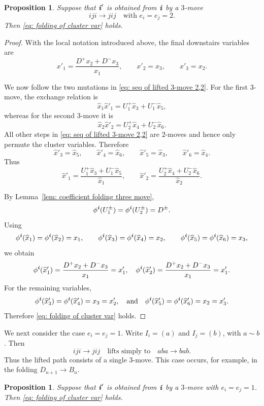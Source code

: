 \documentclass[12pt, leqno]{amsart}
\numberwithin{equation}{section}
\theoremstyle{plain}
\newtheorem{proposition}[lemma]{Proposition}
\theoremstyle{definition}
\newcommand{\ii}{ \textbf{\textit{i}}}
\newcommand{\hx}{\widehat{x}}
\newcommand{\qtq}[1][{and}]{\quad\text{{#1}}\quad}
\begin{document}
\begin{proposition}\label{prop: cluster variable folding three move 22}
Suppose that $\ii'$ is obtained from $\ii$ by a $3$-move
\[
iji\longrightarrow jij \quad \text{with $e_i=e_j=2$.}
\]
Then \eqref{eq: folding of cluster var} holds.
\end{proposition}

\begin{proof}
 With the local notation introduced above, the final downstairs variables are
\[
x'_1=\frac{D^+x_2+D^-x_3}{x_1}, \qquad x'_2=x_3, \qquad x'_3=x_2.
\]

We now follow the two mutations in
\eqref{eq: seq of lifted 3-move 2,2}.
For the first $3$-move, the exchange relation is
\[
\hx_1\hx'_1=U_1^+\hx_3+U_1^-\hx_5,
\]
whereas for the second $3$-move it is
\[
\hx_2\hx'_2=U_2^+\hx_4+U_2^-\hx_6.
\]
All other steps in
\eqref{eq: seq of lifted 3-move 2,2}
are $2$-moves and hence only permute the cluster variables. Therefore
\[
\hx'_3=\hx_5,\qquad   \hx'_4=\hx_6,\qquad   \hx'_5=\hx_3,\qquad   \hx'_6=\hx_4.
\]
Thus
\[
\hx'_1= \frac{U_1^+\hx_3+U_1^-\hx_5}{\hx_1},
\qquad
\hx'_2= \frac{U_2^+\hx_4+U_2^-\hx_6}{\hx_2}.
\]

By Lemma~\ref{lem: coefficient folding three move},
\[
\phi^\ii(U_1^\pm) =\phi^\ii(U_2^\pm) = D^\pm.
\]
Using
\[
\phi^\ii(\hx_1)=\phi^\ii(\hx_2)=x_1,\qquad
\phi^\ii(\hx_3)=\phi^\ii(\hx_4)=x_2,\qquad
\phi^\ii(\hx_5)=\phi^\ii(\hx_6)=x_3,
\]
we obtain
\[
\begin{aligned}
\phi^\ii(\hx'_1) =   \frac{D^+x_2+D^-x_3}{x_1} =x'_1,\quad \phi^\ii(\hx'_2) =  \frac{D^+x_2+D^-x_3}{x_1} =x'_1.
\end{aligned}
\]
For the remaining variables,
\[
\phi^\ii(\hx'_3)=\phi^\ii(\hx'_4)=x_3=x'_2,
\qtq
\phi^\ii(\hx'_5)=\phi^\ii(\hx'_6)=x_2=x'_3.
\]
 Therefore
\eqref{eq: folding of cluster var} holds.
\end{proof}

We next consider the case $e_i=e_j=1$.
Write $I_i=(a)$ and $I_j=(b)$, with $a\sim b$.  Then
\[
  iji\longrightarrow jij \quad\text{lifts simply to}\quad  aba\longrightarrow bab.
\]
Thus the lifted path consists of a single $3$-move.
 This case occurs, for example, in the
folding $D_{n+1}\to B_n$.

\begin{proposition}\label{prop: cluster variable folding three move 11}
Suppose that $\ii'$ is obtained from $\ii$ by a $3$-move with
$e_i=e_j=1$. Then \eqref{eq: folding of cluster var} holds.
\end{proposition}
\end{document}
